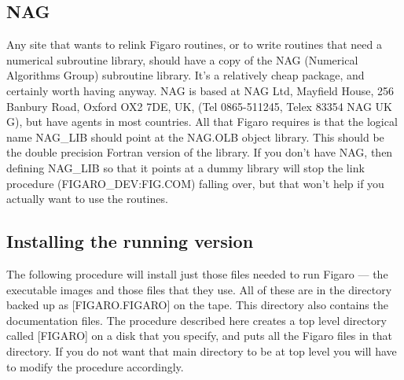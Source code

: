 \subsection{NAG}

Any site that wants to relink Figaro routines, or to write routines  that need
a numerical subroutine library, should have a copy of the NAG (Numerical
Algorithms Group) subroutine library.  It's a relatively cheap  package, and
certainly worth having anyway. NAG is based at NAG Ltd, Mayfield House, 256
Banbury Road, Oxford OX2 7DE, UK, (Tel 0865-511245, Telex 83354 NAG UK G), but
have agents in most countries. All that Figaro requires is that the logical
name NAG\_LIB should point at the NAG.OLB object library. This should be the
double precision Fortran version of the library. If you don't have NAG, then
defining NAG\_LIB so that it points at a dummy library will stop the link
procedure (FIGARO\_DEV:FIG.COM) falling over, but that won't  help if you
actually want to use the routines.

\subsection{Installing the running version}

The following procedure will install just those files needed to run Figaro ---
the executable images and those files that they use. All of these are in the
directory backed up as [FIGARO.FIGARO] on the tape.  This directory  also
contains the documentation files. The procedure described here creates a top
level directory called [FIGARO] on a disk that you specify, and puts all the
Figaro files in that directory. If you do not want that main directory to be at
top level you will have to modify the procedure accordingly.

